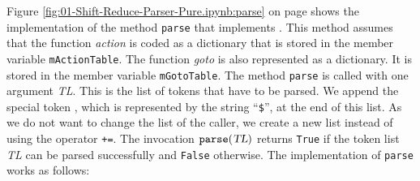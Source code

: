 Figure \ref{fig:01-Shift-Reduce-Parser-Pure.ipynb:parse} on page
\pageref{fig:01-Shift-Reduce-Parser-Pure.ipynb:parse}
shows the implementation of the method \texttt{parse}
that implements .  
This method assumes that the function \textsl{action} is coded
as a dictionary that is stored in the member variable \texttt{mActionTable}.
The function \textsl{goto} is also represented as a dictionary.  It is stored in the
member variable \texttt{mGotoTable}.  The method \texttt{parse} is called with one
argument \textsl{TL}.  This is the list of tokens that have to be parsed.  We append the special token
, which is represented by the string ``\texttt{\$}'', at the end of this list.
As we do not want to change the list of the caller, we
create a new list instead of using the operator \texttt{+=}.  The invocation
$\texttt{parse}(\textsl{TL})$ returns \texttt{True} if the token list \textsl{TL} can be
parsed successfully and \texttt{False} otherwise.  The implementation of \texttt{parse} works as follows:
